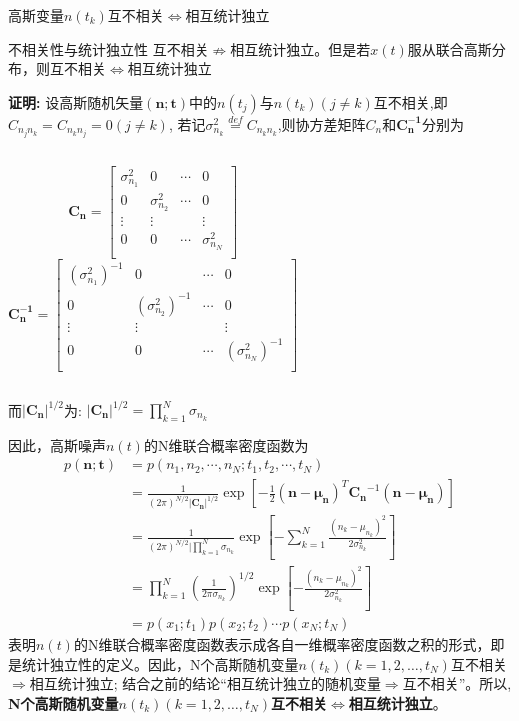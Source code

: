 \begin{frame}{高斯变量$n(t_k)$互不相关$\Leftrightarrow$相互统计独立}
	\begin{block}{不相关性与统计独立性}
		互不相关$\nRightarrow$相互统计独立。但是若$x(t)$服从联合高斯分布，则互不相关$\Leftrightarrow$相互统计独立
	\end{block}
\textbf{证明:} 设高斯随机矢量$\bm{(n;t)}$中的$n(t_j)$与$n(t_k)(j\ne k)$互不相关,即$C_{n_jn_k}=C_{n_kn_j}=0(j\ne k)$, 若记$\sigma_{n_k}^2\mathop{=}\limits^{def}C_{n_kn_k}$,则协方差矩阵$C_n$和$\bm{C_n^{-1}}$分别为
	\begin{columns}
		$$
		\bm{C_n}=\left[
		\begin{matrix}
		\sigma_{n_1}^2 &  0                 & \cdots & 0\\
		0              &  \sigma_{n_2}^2  & \cdots & 0\\
		\vdots         &  \vdots            &        &\vdots \\
		0              &  0                 & \cdots &\sigma_{n_N}^2\\
		\end{matrix}
		\right]
		$$
		$$\bm{C_n^{-1}}=\left[
		\begin{matrix}
		(\sigma_{n_1}^2)^{-1} &  0                 & \cdots & 0\\
		0              &  (\sigma_{n_2}^2)^{-1}  & \cdots & 0\\
		\vdots         &  \vdots            &        &\vdots \\
		0              &  0                 & \cdots &(\sigma_{n_N}^2)^{-1}\\
		\end{matrix}
		\right]
		$$
	\end{columns}
	而$|\bm{C_n}|^{1/2}$为: $|\bm{C_n}|^{1/2}=\prod\limits_{k=1}^{N}\sigma_{n_k}$
\end{frame}

\begin{frame}
	因此，高斯噪声$n(t)$的N维联合概率密度函数为
	\begin{align*}
	p(\bm{n;t})&=p(n_1,n_2,\cdots,n_N; t_1,t_2,\cdots,t_N)\\
	&=\frac{1}{(2\pi)^{N/2}|\bm{C_n}|^{1/2}}\exp\left[-\frac{1}{2}(\bm{n-\mu_n})^T\bm{C_n}^{-1}(\bm{n-\mu_n})\right]\\
	&=\frac{1}{(2\pi)^{N/2}|\prod\limits_{k=1}^{N}\sigma_{n_k}}\exp\left[-\sum\limits_{k=1}^{N}\frac{(n_k-\mu_{n_k})^2}{2\sigma_{n_k}^2}\right]\\
	&=\prod\limits_{k=1}^{N}\left(\frac{1}{2\pi\sigma_{n_k}}\right)^{1/2}\exp\left[-\frac{(n_k-\mu_{n_k})^2}{2\sigma_{n_k}^2}\right]\\
	&=p(x_1;t_1)p(x_2;t_2)\cdots p(x_N;t_N)
	\end{align*}
	表明$n(t)$的N维联合概率密度函数表示成各自一维概率密度函数之积的形式，即是统计独立性的定义。因此，N个高斯随机变量$n(t_k)(k=1,2,\dots,t_N)$互不相关$\Rightarrow$相互统计独立; 结合之前的结论``相互统计独立的随机变量$\Rightarrow$互不相关''。所以, \textbf{
	N个高斯随机变量$n(t_k)(k=1,2,\dots,t_N)$互不相关$\Leftrightarrow$相互统计独立}。
\end{frame}

